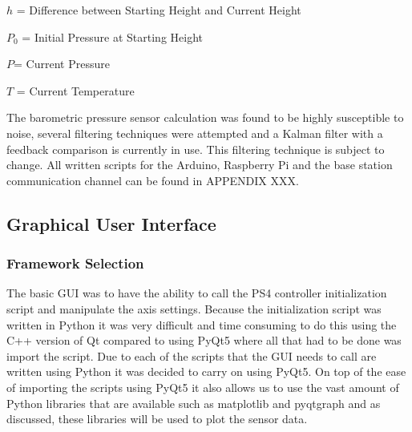 $h$ = Difference between Starting Height and Current Height

$P_{0}$ = Initial Pressure at Starting Height

$P$= Current Pressure

$T$ = Current Temperature

\vspace*{0.2in}

The barometric pressure sensor calculation was found to be highly susceptible to noise, several filtering techniques were attempted and a Kalman filter with a feedback comparison is currently in use. This filtering technique is subject to change. All written scripts for the Arduino, Raspberry Pi and the base station communication channel can be found in APPENDIX XXX. 


\subsection{Graphical User Interface}
\subsubsection{Framework Selection}
The basic GUI was to have the ability to call the PS4 controller initialization script and manipulate the axis settings. Because the initialization script was written in Python it was very difficult and time consuming to do this using the C++ version of Qt compared to using PyQt5 where all that had to be done was import the script. Due to each of the scripts that the GUI needs to call are written using Python it was decided to carry on using PyQt5. On top of the ease of importing the scripts using PyQt5 it also allows us to use the vast amount of Python libraries that are available such as matplotlib and pyqtgraph and as discussed, these libraries will be used to plot the sensor data. 
